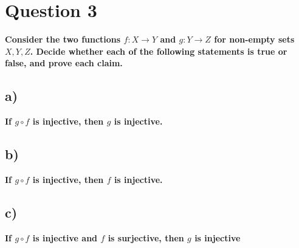\documentclass{article}
\begin{document}
\section{Question 3}
\textbf{ Consider the two functions $f: X \rightarrow Y$ and $g: Y \rightarrow Z$ for non-empty sets $X, Y, Z$.
Decide whether each of the following statements is true or false, and prove each claim.}
\subsection{a)}
\textbf{ If $g \circ f$ is injective, then $g$ is injective.}
\newpage
\subsection{b)}
\textbf{ If $g \circ f$ is injective, then $f$ is injective. }
\newpage
\subsection{c)}
\textbf{ If $g \circ f$ is injective and $f$ is surjective, then $g$ is injective}
\end{document}
